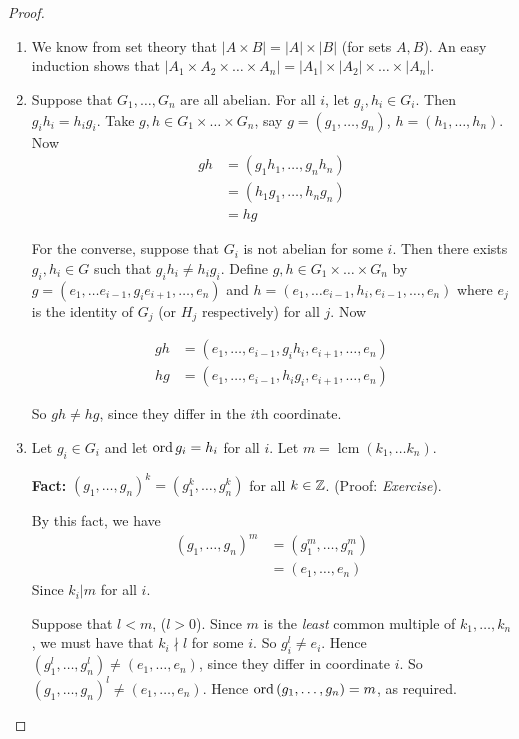 \documentclass{article}
\theoremstyle{definition} \newtheorem*{definition}{Definition}
\DeclareMathOperator{\lcm}{lcm} \DeclareMathOperator{\hcf}{hcf}
\begin{document}
\begin{proof}\hfill \begin{enumerate} \item We know from set theory that $|A
          \times B| = |A| \times |B|$ (for sets $A,B$). An easy induction shows
          that $|A_1 \times A_2 \times \dots \times A_n| = |A_1| \times |A_2|
          \times \dots \times |A_n|$.  \item Suppose that $G_1, \dots , G_n$
            are all abelian. For all $i$, let $g_i,h_i\in G_i$. Then
            $g_ih_i=h_ig_i$. Take $g,h \in G_1 \times \dots \times G_n$, say
            $g=\left( g_1, \dots , g_n \right)$, $h = \left( h_1, \dots , h_n
            \right)$. Now \begin{align*} gh &= \left( g_1 h_1, \dots , g_n h_n
              \right)\\ &= \left( h_1g_1, \dots , h_n g_n \right)\\ &= hg
            \end{align*}

For the converse, suppose that $G_i$ is not abelian for some $i$. Then there
exists $g_i,h_i \in G$ such that $g_ih_i \neq h_ig_i$. Define $g,h \in G_1
\times \dots \times G_n$ by $g = \left( e_1,\dots e_{i-1},g_ie_{i+1},\dots,e_n
\right)$ and $h = \left( e_1, \dots e_{i-1},h_i,e_{i-1},\dots,e_n \right)$
where $e_j$ is the identity of $G_j$ (or $H_j$ respectively) for all $j$. Now

\begin{align*} gh &= \left( e_1,\dots,e_{i-1},g_ih_i,e_{i+1},\dots,e_n
  \right)\\ hg &= \left( e_1,\dots,e_{i-1},h_ig_i,e_{i+1},\dots,e_n \right)
\end{align*}

So $gh \neq hg$, since they differ in the $i$th coordinate.

\item Let $g_i \in G_i$ and let $\operatorname{\text{ord}} g_i=h_i$ for all $i$. Let
  $m=\lcm(k_1,\dots k_n)$.

  \textbf{Fact:} $(g_1, \dots ,g_n)^{k}=(g_1^k,\dots,g_n^k)$ for all $k \in
  \mathbb{Z}$. (Proof: \emph{Exercise}).

  By this fact, we have \begin{align*} \left( g_1, \dots, g_n \right)^m &=
    \left( g_1^m, \dots,g_n^m \right)\\ &= \left( e_1, \dots,e_n \right)
  \end{align*} Since $k_i | m$ for all $i$.

  Suppose that $l<m$, ($l>0$). Since $m$ is the \emph{least} common multiple of
  $k_1, \dots, k_n$, we must have that $k_i\nmid l$ for some $i$. So $g_i^l\neq
  e_i$. Hence $\left( g_1^l,\dots,g_n^l \right) \neq \left( e_1,\dots,e_n
  \right)$, since they differ in coordinate $i$. So $\left( g_1 ,\dots,g_n
  \right)^l \neq \left( e_1, \dots,e_n \right)$. Hence $\operatorname{\text{ord}} \left( g_1
  ,\dots,g_n \right)=m$, as required.  \end{enumerate} \end{proof}
\end{document}
